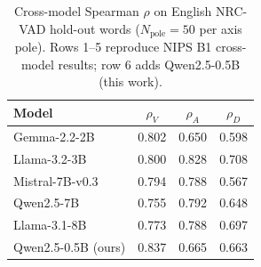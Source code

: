 \begin{table}[t]
\caption{Cross-model Spearman $\rho$ on English NRC-VAD hold-out words ($N_{\mathrm{pole}}{=}50$ per axis pole). Rows 1--5 reproduce NIPS B1 cross-model results; row 6 adds Qwen2.5-0.5B (this work).}
\label{tab:e2_cross_model_spearman}
\centering
\begin{tabular}{lccc}
\toprule
Model & $\rho_V$ & $\rho_A$ & $\rho_D$ \\
\midrule
Gemma-2.2-2B & 0.802 & 0.650 & 0.598 \\
Llama-3.2-3B & 0.800 & 0.828 & 0.708 \\
Mistral-7B-v0.3 & 0.794 & 0.788 & 0.567 \\
Qwen2.5-7B & 0.755 & 0.792 & 0.648 \\
Llama-3.1-8B & 0.773 & 0.788 & 0.697 \\
Qwen2.5-0.5B (ours) & 0.837 & 0.665 & 0.663 \\
\bottomrule
\end{tabular}
\end{table}
